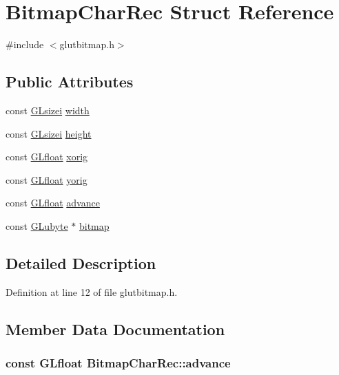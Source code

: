 \hypertarget{struct_bitmap_char_rec}{\section{Bitmap\-Char\-Rec Struct Reference}
\label{struct_bitmap_char_rec}
}


{\ttfamily \#include $<$glutbitmap.\-h$>$}

\subsection*{Public Attributes}
\begin{DoxyCompactItemize}
\item 
const \hyperlink{gl_8h_a9289d5b99dc1f27f01480360f2e18ae0}{G\-Lsizei} \hyperlink{struct_bitmap_char_rec_aec4f640649f028cbd750a29307587d45}{width}
\item 
const \hyperlink{gl_8h_a9289d5b99dc1f27f01480360f2e18ae0}{G\-Lsizei} \hyperlink{struct_bitmap_char_rec_a635c0cdf674896272c549c1ab3d82b21}{height}
\item 
const \hyperlink{gl_8h_a31aeedaeef29442c9c015ab355c8f5ab}{G\-Lfloat} \hyperlink{struct_bitmap_char_rec_a0349720d81a4c62afe6561201997e995}{xorig}
\item 
const \hyperlink{gl_8h_a31aeedaeef29442c9c015ab355c8f5ab}{G\-Lfloat} \hyperlink{struct_bitmap_char_rec_a7351bb7d319ab8e79da4e16e6aacddaf}{yorig}
\item 
const \hyperlink{gl_8h_a31aeedaeef29442c9c015ab355c8f5ab}{G\-Lfloat} \hyperlink{struct_bitmap_char_rec_a829d8afb40c22d832dad5369cfa54aa9}{advance}
\item 
const \hyperlink{gl_8h_a0595908be03a8cff881a23cdc9170e7c}{G\-Lubyte} $\ast$ \hyperlink{struct_bitmap_char_rec_af9859692f6e3089f377788f458dd50bb}{bitmap}
\end{DoxyCompactItemize}


\subsection{Detailed Description}


Definition at line 12 of file glutbitmap.\-h.



\subsection{Member Data Documentation}
\hypertarget{struct_bitmap_char_rec_a829d8afb40c22d832dad5369cfa54aa9}{
\subsubsection[{advance}]{\setlength{\rightskip}{0pt plus 5cm}const {\bf G\-Lfloat} Bitmap\-Char\-Rec\-::advance}}\label{struct_bitmap_char_rec_a829d8afb40c22d832dad5369cfa54aa9}


